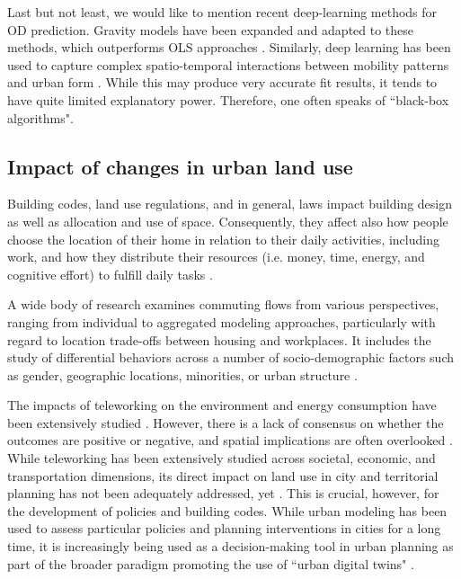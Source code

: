 Last but not least, we would like to mention recent deep-learning methods for OD prediction. Gravity models have been expanded and adapted to these methods, which outperforms OLS approaches \citep{Simini2021AGeneration}. Similarly, deep learning has been used to capture complex spatio-temporal interactions between mobility patterns and urban form \citep{Cai2022SpatialFlow, Koca2021Origin-destinationStudy, Yeghikyan2020LearningNetworks, Liu2020LearningPrediction, Yao2021SpatialNetworks, Yin2022ConvGCN-RF:Effects, Rodriguez-Rueda2021OriginDestinationModel}. While this may produce very accurate fit results, it tends to have quite limited explanatory power. Therefore, one often speaks of ``black-box algorithms".

\subsection{Impact of changes in urban land use}
\label{sub:ETRCO2H_1.3intro_urban}

Building codes, land use regulations, and in general, laws impact building design as well as allocation and use of space. Consequently, they affect also how people choose the location of their home in relation to their daily activities, including work, and how they distribute their resources (i.e. money, time, energy, and cognitive effort) to fulfill daily tasks \citep{Spadon2019ReconstructingIndicators, Simini2012APatterns, Prytherch2012, Levine2019FromPlanning, Jayarajah2018UnderstandingPlanning}. 

A wide body of research examines commuting flows from various perspectives, ranging from individual to aggregated modeling approaches, particularly with regard to location trade-offs between housing and workplaces. It includes the study of differential behaviors across a number of socio-demographic factors such as gender, geographic locations, minorities, or urban structure \citep{Farmer2011CommutingTravel-to-work, Rong2023AnTechniques}.

The impacts of teleworking on the environment and energy consumption have been extensively studied \citep{Giovanis2018, Dissanayake2008, Fu2012EnvironmentalSocio-demographics, Koenig1996UsingProject, Kitou2008ExternalTelework}. However, there is a lack of consensus on whether the outcomes are positive or negative, and spatial implications are often overlooked \citep{Dissanayake2008,Kitou2008ExternalTelework, Bussiere2002Impact1996-2016, Jaff2018EstimatingMalaysia}. While teleworking has been extensively studied across societal, economic, and transportation dimensions, its direct impact on land use in city and territorial planning has not been adequately addressed, yet \citep{Zenkteler2019Home-basedResponse}. This is crucial, however, for the development of policies and building codes. While urban modeling has been used to assess particular policies and planning interventions in cities \citep{Alonso2017ModellingMadrid, Lopane2023AModeling} for a long time, it is increasingly being used as a decision-making tool in urban planning as part of the broader paradigm promoting the use of ``urban digital twins" \citep{Batty2018, Bettencourt2024RecentTwins}.

